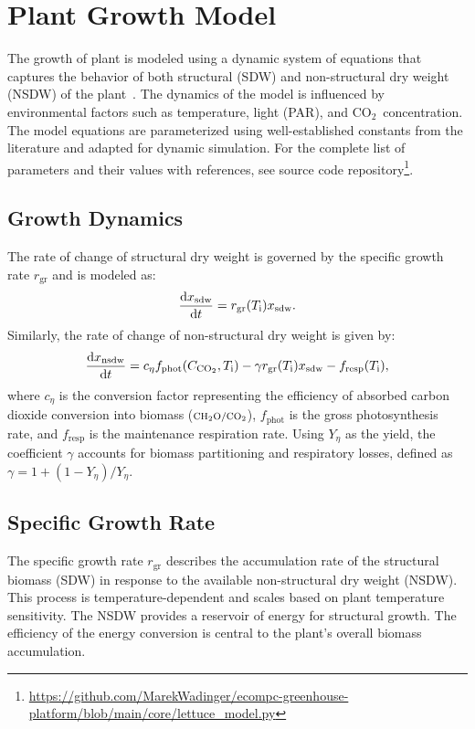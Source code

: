 \documentclass[conference]{IEEEtran}
\newcommand{\ui}[2]{#1_{\mathrm{#2}}}
\newcommand{\coo}{\ensuremath{\mathrm{CO_2}}}
\newcommand{\chho}{\ensuremath{\mathrm{CH_2O}}}
\begin{document}
\section{Plant Growth Model}\label{sec:lettuce_growth}
The growth of plant is modeled using a dynamic system of equations that captures the behavior of both structural (SDW) and non-structural dry weight (NSDW) of the plant~\cite{VANHENTEN199455}. The dynamics of the model is influenced by environmental factors such as temperature, light (PAR), and \coo\ concentration. The model equations are parameterized using well-established constants from the literature and adapted for dynamic simulation. For the complete list of parameters and their values with references, see source code repository\footnote{\url{https://github.com/MarekWadinger/ecompc-greenhouse-platform/blob/main/core/lettuce_model.py}}.

\subsection{Growth Dynamics} The rate of change of structural dry weight is governed by the specific growth rate \( \ui{r}{gr} \) and is modeled as:
\begin{equation}
    \diff{\ui{x}{sdw}}{t} = \ui{r}{gr}(\ui{T}{i}) \ui{x}{sdw}.
\end{equation}
Similarly, the rate of change of non-structural dry weight is given by:
\begin{equation}
    \diff{\ui{x}{nsdw}}{t} = c_{\eta} \ui{f}{phot}(\ui{C}{\coo}, \ui{T}{i}) - \gamma \ui{r}{gr}(\ui{T}{i}) \ui{x}{sdw} - \ui{f}{resp}(\ui{T}{i}),
\end{equation}
where \( c_{\eta} \) is the conversion factor representing the efficiency of absorbed carbon dioxide conversion into biomass (\(\mathsmaller{\chho/\coo}\)), \( \ui{f}{phot} \) is the gross photosynthesis rate, and \( \ui{f}{resp} \) is the maintenance respiration rate. Using \( Y_{\eta} \) as the yield, the coefficient \( \gamma \) accounts for biomass partitioning and respiratory losses, defined as \( \gamma = 1 + (1 - Y_{\eta}) / Y_{\eta} \).

\subsection{Specific Growth Rate} The specific growth rate \( \ui{r}{gr} \) describes the accumulation rate of the structural biomass (SDW) in response to the available non-structural dry weight (NSDW). This process is temperature-dependent and scales based on plant temperature sensitivity. The NSDW provides a reservoir of energy for structural growth. The efficiency of the energy conversion is central to the plant's overall biomass accumulation.
\end{document}
